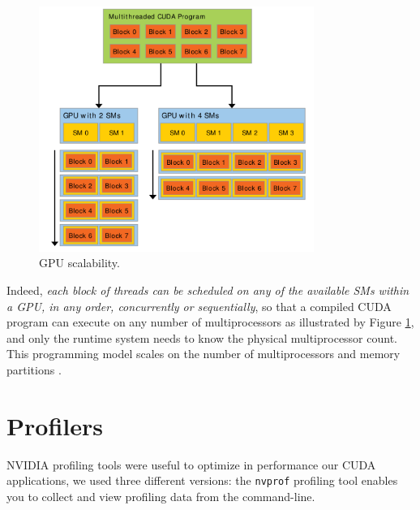 	\begin{figure}[H]
		\centering
		\includegraphics[width=0.8\textwidth]{images/cudaSMs.png}
		\caption{GPU scalability.}
		\label{fig:cudaSM}
	\end{figure}
	Indeed, \textit{each block of threads can be scheduled on any of the available SMs within a GPU, in any order, concurrently or sequentially}, so that a compiled CUDA program can execute on any number of multiprocessors as illustrated by Figure \ref{fig:cudaSM}, and only the runtime system needs to know the physical multiprocessor count.
	This programming model scales on the number of multiprocessors and memory partitions \cite{cudaguide}.  

\section{Profilers}	
	NVIDIA profiling tools were useful to optimize in performance our CUDA applications, we used three different versions: the \texttt{nvprof} profiling tool enables you to collect and view profiling data from the command-line. 
	
	
	
